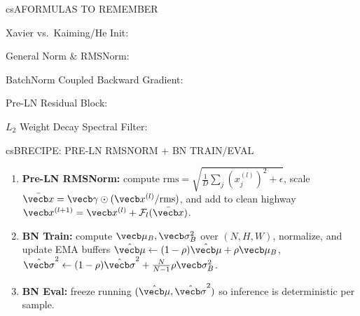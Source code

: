 \documentclass[../../../../master.tex]{subfiles}
\begin{document}
\begin{cscolumns}
\begin{cscard}{csA}{FORMULAS TO REMEMBER}
  \begin{csbul}
    \item Xavier vs.\ Kaiming/He Init:
    \item General Norm \& RMSNorm:
    \item BatchNorm Coupled Backward Gradient:
    \item Pre-LN Residual Block:
    \item $L_2$ Weight Decay Spectral Filter:
  \end{csbul}
\end{cscard}

\begin{cscard}{csB}{RECIPE: PRE-LN RMSNORM + BN TRAIN/EVAL}
  \begin{enumerate}[leftmargin=1.2em, itemsep=1pt, topsep=1pt, parsep=0pt]
    \item \textbf{Pre-LN RMSNorm:} compute $\mathrm{rms}=\sqrt{\frac{1}{D}\sum_j (x_j^{(l)})^2+\epsilon}$, scale $\bar{\vecb x}=\vecb\gamma\odot(\vecb x^{(l)}/\mathrm{rms})$, and add to clean highway $\vecb x^{(l+1)}=\vecb x^{(l)}+\mathcal{F}_l(\bar{\vecb x})$.
    \item \textbf{BN Train:} compute $\vecb\mu_B,\vecb\sigma_B^2$ over $(N,H,W)$, normalize, and update EMA buffers $\hat{\vecb\mu}\leftarrow(1-\rho)\hat{\vecb\mu}+\rho\vecb\mu_B$, $\hat{\vecb\sigma}^2\leftarrow(1-\rho)\hat{\vecb\sigma}^2+\frac{N}{N-1}\rho\vecb\sigma_B^2$.
    \item \textbf{BN Eval:} freeze running $(\hat{\vecb\mu},\hat{\vecb\sigma}^2)$ so inference is deterministic per sample.
  \end{enumerate}
\end{cscard}
\columnbreak


\end{cscolumns}
\end{document}
